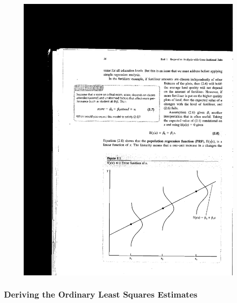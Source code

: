 \documentclass[notes=show]{beamer}
\begin{document}
\begin{frame}[plain]

\begin{figure}
\includegraphics[scale=0.7]{./lecture_includes/wooldridge_fig21.pdf}
\end{figure}
\end{frame}

\subsubsection{Deriving the Ordinary Least Squares Estimates}
\end{document}
